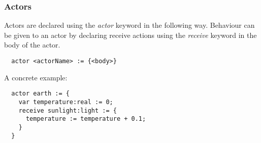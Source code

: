 \subsubsection{Actors}
\label{subsec:actors}

Actors are declared using the \emph{actor} keyword in the following way. Behaviour can be given to an actor by declaring receive actions using the \emph{receive} keyword in the body of the actor.

\begin{verbatim}
  actor <actorName> := {<body>}
\end{verbatim}

A concrete example:

\begin{verbatim}
  actor earth := {
    var temperature:real := 0;
    receive sunlight:light := {
      temperature := temperature + 0.1;
    }
  }
\end{verbatim}
